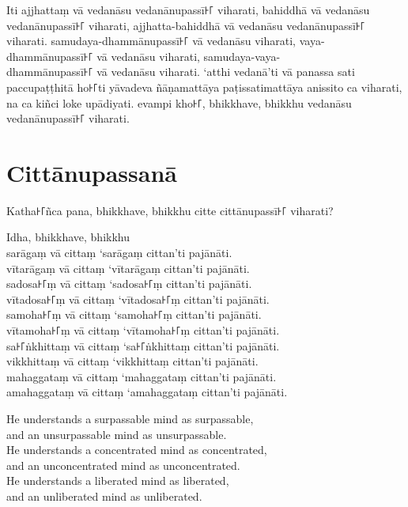 \paliPage

Iti ajjhattaṃ vā vedanāsu vedanānupassī꜔꜒ viharati, bahiddhā vā vedanāsu
vedanānupassī꜔꜒ viharati, ajjhatta-bahiddhā vā vedanāsu vedanānupassī꜔꜒ viharati.
samudaya-dhammānupassī꜔꜒ vā vedanāsu viharati, vaya-dhammānupassī꜔꜒ vā vedanāsu
viharati, samudaya-vaya-\\
dhammānupassī꜔꜒ vā vedanāsu viharati. ‘atthi vedanā’ti vā panassa sati
paccupaṭṭhitā ho꜔꜒ti yāvadeva ñāṇamattāya paṭissatimattāya anissito ca viharati,
na ca kiñci loke upādiyati. evampi kho꜔꜒, bhikkhave, bhikkhu vedanāsu
vedanānupassī꜔꜒ viharati.


\chapter*{Cittānupassanā}

Katha꜔꜒ñca pana, bhikkhave, bhikkhu citte cittānupassī꜔꜒ viharati?

Idha, bhikkhave, bhikkhu\\
sarāgaṃ vā cittaṃ ‘sarāgaṃ cittan’ti pajānāti.\\
vītarāgaṃ vā cittaṃ ‘vītarāgaṃ cittan’ti pajānāti.\\
sadosa꜔꜒ṃ vā cittaṃ ‘sadosa꜔꜒ṃ cittan’ti pajānāti.\\
vītadosa꜔꜒ṃ vā cittaṃ ‘vītadosa꜔꜒ṃ cittan’ti pajānāti.\\
samoha꜔꜒ṃ vā cittaṃ ‘samoha꜔꜒ṃ cittan’ti pajānāti.\\
vītamoha꜔꜒ṃ vā cittaṃ ‘vītamoha꜔꜒ṃ cittan’ti pajānāti.\\
sa꜔꜒ṅkhittaṃ vā cittaṃ ‘sa꜔꜒ṅkhittaṃ cittan’ti pajānāti.\\
vikkhittaṃ vā cittaṃ ‘vikkhittaṃ cittan’ti pajānāti.\\
mahaggataṃ vā cittaṃ ‘mahaggataṃ cittan’ti pajānāti.\\
amahaggataṃ vā cittaṃ ‘amahaggataṃ cittan’ti pajānāti.

\englishPage

He understands a surpassable mind as surpassable,\\
and an unsurpassable mind as unsurpassable.\\
He understands a concentrated mind as concentrated,\\
and an unconcentrated mind as unconcentrated.\\
He understands a liberated mind as liberated,\\
and an unliberated mind as unliberated.

